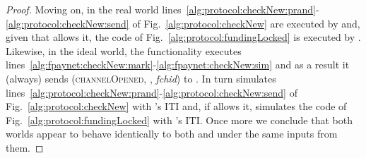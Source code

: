 \begin{proof}
    Moving on, in the real world
    lines~\ref{alg:protocol:checkNew:prand}-\ref{alg:protocol:checkNew:send} of
    Fig.~\ref{alg:protocol:checkNew} are executed by \alice{} and, given that
    \adversary{} allows it, the code of Fig.~\ref{alg:protocol:fundingLocked} is
    executed by \bob. Likewise, in the ideal world, the functionality executes
    lines~\ref{alg:fpaynet:checkNew:mark}-\ref{alg:fpaynet:checkNew:sim} and as
    a result it (always) sends (\textsc{channelOpened}, \alice, \textit{fchid})
    to \simulator. In turn \simulator{} simulates
    lines~\ref{alg:protocol:checkNew:prand}-\ref{alg:protocol:checkNew:send} of
    Fig.~\ref{alg:protocol:checkNew} with \alice's ITI and, if \adversary{}
    allows it, \simulator{} simulates the code of
    Fig.~\ref{alg:protocol:fundingLocked} with \bob's ITI. Once more we conclude
    that both worlds appear to behave identically to both \environment{} and
    \adversary{} under the same inputs from them.
  \end{proof}
